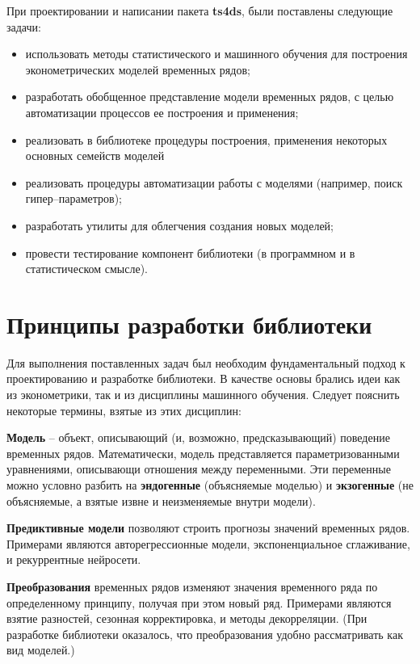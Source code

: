 \documentclass[a4paper,14pt]{extreport}
\begin{document}
	При проектировании и написании пакета \textbf{ts4ds}, были поставлены следующие задачи:
	\begin{itemize}
		\item использовать методы статистического и машинного обучения для построения эконометрических моделей временных рядов;
		\item разработать обобщенное представление модели временных рядов, с целью автоматизации процессов ее построения и применения;
		\item реализовать в библиотеке процедуры построения, применения некоторых основных семейств моделей
		\item реализовать процедуры автоматизации работы с моделями (например, поиск гипер–параметров);
		\item разработать утилиты для облегчения создания новых моделей;
		\item провести тестирование компонент библиотеки (в программном и в статистическом смысле).
	\end{itemize}
	
	\section{Принципы разработки библиотеки}
	
	Для выполнения поставленных задач был необходим фундаментальный подход к проектированию и разработке библиотеки. В качестве основы брались идеи как из эконометрики, так и из дисциплины машинного обучения. Следует пояснить некоторые термины, взятые из этих дисциплин:
	
	\textbf{Модель} – объект, описывающий (и, возможно, предсказывающий) поведение временных рядов. Математически, модель представляется параметризованными уравнениями, описывающи отношения между переменными. Эти переменные можно условно разбить на \textbf{эндогенные} (объясняемые моделью) и \textbf{экзогенные} (не объясняемые, а взятые извне и неизменяемые внутри модели).
	
	\textbf{Предиктивные модели} позволяют строить прогнозы значений временных рядов. Примерами являются авторегрессионные модели, экспоненциальное сглаживание, и рекуррентные нейросети.
	
	\textbf{Преобразования} временных рядов изменяют значения временного ряда по определенному принципу, получая при этом новый ряд. Примерами являются взятие разностей, сезонная корректировка, и методы декорреляции. (При разработке библиотеки оказалось, что преобразования удобно рассматривать как вид моделей.)
	
\end{document}
